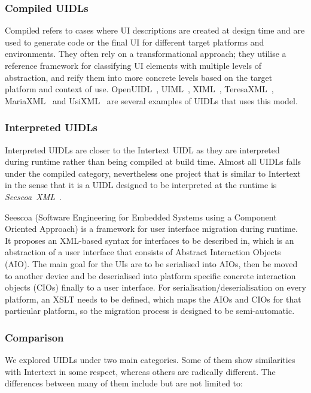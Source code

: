 \subsubsection{Compiled UIDLs}

Compiled refers to cases where UI descriptions are created at design time and are used to generate code or the final UI for different target platforms and environments. They often rely on a transformational approach; they utilise a reference framework for classifying UI elements with multiple levels of abstraction, and reify them into more concrete levels based on the target platform and context of use. \mbox{OpenUIDL}~\cite{openuidl}, \mbox{UIML}~\cite{UIML}, \mbox{XIML}~\cite{XIML}, \mbox{TeresaXML}~\cite{TeresaXML}, \mbox{MariaXML}~\cite{MariaXML} and \mbox{UsiXML}~\cite{UsiXML} are several examples of UIDLs that uses this model. 

\subsubsection{Interpreted UIDLs}

Interpreted UIDLs are closer to the Intertext UIDL as they are interpreted during runtime rather than being compiled at build time. Almost all UIDLs falls under the compiled category, nevertheless one project that is similar to Intertext in the sense that it is a UIDL designed to be interpreted at the runtime is \emph{\mbox{Seescoa XML}}~\cite{seescoa}. 

Seescoa (Software Engineering for Embedded Systems using a Component Oriented Approach) is a framework for user interface migration during runtime. It proposes an XML-based syntax for interfaces to be described in, which is an abstraction of a user interface that consists of Abstract Interaction Objects (AIO). The main goal for the UIs are to be serialised into AIOs, then be moved to another device and be deserialised into platform specific concrete interaction objects (CIOs) finally to a user interface. For serialisation/deserialisation on every platform, an XSLT needs to be defined, which maps the AIOs and CIOs for that particular platform, so the migration process is designed to be semi-automatic.

\subsubsection{Comparison}

We explored UIDLs under two main categories. Some of them show similarities with Intertext in some respect, whereas others are radically different. The differences between many of them include but are not limited to:

